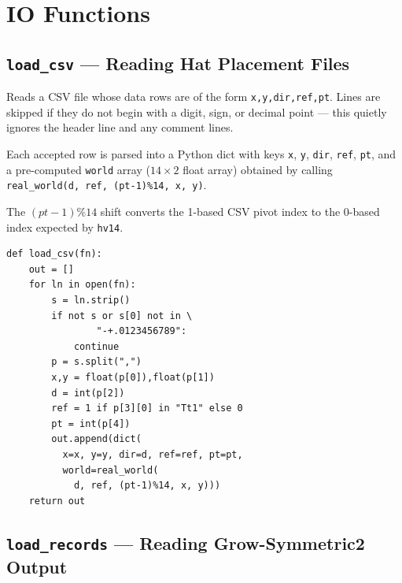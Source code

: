 \documentclass[10pt,a4paper]{article}
\let\polysection\section
\renewcommand\section{\needspace{0.16\textheight}\polysection}
\let\polysubsection\subsection
\renewcommand\subsection{\needspace{0.12\textheight}\polysubsection}
\newcommand{\code}[1]{\texttt{\small #1}}
\begin{document}
\section{IO Functions}

\subsection{\code{load\_csv} — Reading Hat Placement Files}

\begin{tcolorbox}[dualbox, title={\code{load\_csv(fn)} — load hat records from CSV}]
  Reads a CSV file whose data rows are of the form
  \texttt{x,y,dir,ref,pt}.  Lines are skipped if they do not begin with
  a digit, sign, or decimal point — this quietly ignores the header line and
  any comment lines.

  Each accepted row is parsed into a Python dict with keys
  \code{x}, \code{y}, \code{dir}, \code{ref}, \code{pt}, and a pre-computed
  \code{world} array ($14\times 2$ float array) obtained by calling
  \code{real\_world(d, ref, (pt-1)\%14, x, y)}.

  The $(pt-1)\%14$ shift converts the 1-based CSV pivot index to the
  0-based index expected by \code{hv14}.
\tcblower
\begin{verbatim}
def load_csv(fn):
    out = []
    for ln in open(fn):
        s = ln.strip()
        if not s or s[0] not in \
                "-+.0123456789":
            continue
        p = s.split(",")
        x,y = float(p[0]),float(p[1])
        d = int(p[2])
        ref = 1 if p[3][0] in "Tt1" else 0
        pt = int(p[4])
        out.append(dict(
          x=x, y=y, dir=d, ref=ref, pt=pt,
          world=real_world(
            d, ref, (pt-1)%14, x, y)))
    return out
\end{verbatim}
\end{tcolorbox}

\subsection{\code{load\_records} — Reading Grow-Symmetric2 Output}
\end{document}
